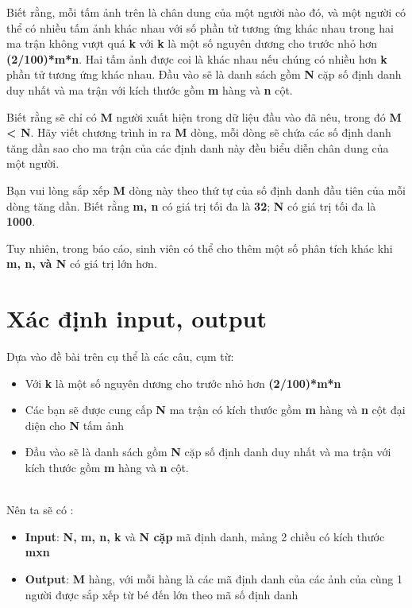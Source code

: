 \documentclass [14pt, a4paper]{report}
\begin{document}
Biết rằng, mỗi tấm ảnh trên là chân dung của một người nào đó, và một người có thể có nhiều tấm ảnh khác nhau với số phần tử tương ứng khác nhau trong hai ma trận không vượt quá \textbf{k} với\textbf{ k} là một số nguyên dương cho trước nhỏ hơn \textbf{(2/100)*m*n}. Hai tấm ảnh được coi là khác nhau nếu chúng có nhiều hơn\textbf{ k} phần tử tương ứng khác nhau. Đầu vào sẽ là danh sách gồm\textbf{ N} cặp số định danh duy nhất và ma trận với kích thước gồm\textbf{ m} hàng và\textbf{ n } cột.


Biết rằng sẽ chỉ có \textbf{ M} người xuất hiện trong dữ liệu đầu vào đã nêu, trong đó\textbf{ M < N}. Hãy viết chương trình in ra \textbf{ M} dòng, mỗi dòng sẽ chứa các số định danh tăng dần sao cho ma trận của các định danh này đều biểu diễn chân dung của một người.


Bạn vui lòng sắp xếp \textbf{ M} dòng này theo thứ tự của số định danh đầu tiên của mỗi dòng tăng dần. Biết rằng \textbf{ m, n} có giá trị tối đa là \textbf{32}; \textbf{N} có giá trị tối đa là \textbf{1000}.


Tuy nhiên, trong báo cáo, sinh viên có thể cho thêm một số phân tích khác khi \textbf{ m, n, và N } có giá trị lớn hơn.
\section{Xác định input, output}
Dựa vào đề bài trên cụ thể là các câu, cụm từ:
\begin{itemize}
\fontsize{13}{18}\selectfont
  \item  Với\textbf{ k} là một số nguyên dương cho trước nhỏ hơn \textbf{(2/100)*m*n}
  \item Các bạn sẽ được cung cấp\textbf{ N} ma trận có kích thước gồm \textbf{m} hàng và \textbf{n} cột đại diện cho \textbf{N} tấm ảnh
    \item  Đầu vào sẽ là danh sách gồm\textbf{ N} cặp số định danh duy nhất và ma trận với kích thước gồm\textbf{ m} hàng và\textbf{ n } cột.
\end{itemize}

\hfill\\
Nên ta sẽ có :
\begin{itemize}
\fontsize{13}{18}\selectfont
  \item  \textbf{Input}:  \textbf{N, m, n, k} và \textbf{N cặp} mã định danh, mảng 2 chiều có kích thước \textbf {mxn}
  \item \textbf{Output}: \textbf{M} hàng, với mỗi hàng là các mã định danh của các ảnh của cùng 1 người được sắp xếp từ bé đến lớn theo mã số định danh
\end{itemize}
\end{document}
